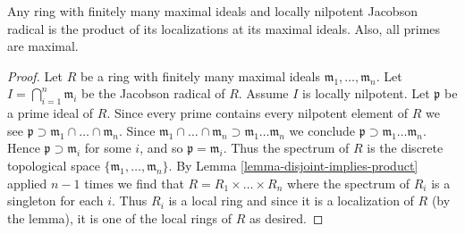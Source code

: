 \begin{lemma}
\label{lemma-product-local}
Any ring with finitely many maximal ideals and
locally nilpotent Jacobson radical is the product of its localizations
at its maximal ideals. Also, all primes are maximal.
\end{lemma}

\begin{proof}
Let $R$ be a ring with finitely many maximal ideals
$\mathfrak m_1, \ldots, \mathfrak m_n$.
Let $I = \bigcap_{i = 1}^n \mathfrak m_i$
be the Jacobson radical of $R$. Assume $I$ is locally nilpotent.
Let $\mathfrak p$ be a prime ideal of $R$.
Since every prime contains every nilpotent
element of $R$ we see
$ \mathfrak p \supset \mathfrak m_1 \cap \ldots \cap \mathfrak m_n$.
Since $\mathfrak m_1 \cap \ldots \cap \mathfrak m_n \supset
\mathfrak m_1 \ldots \mathfrak m_n$
we conclude $\mathfrak p \supset \mathfrak m_1 \ldots \mathfrak m_n$.
Hence $\mathfrak p \supset \mathfrak m_i$ for some $i$, and so
$\mathfrak p = \mathfrak m_i$. Thus the spectrum of $R$
is the discrete topological space $\{\mathfrak m_1, \ldots, \mathfrak m_n\}$.
By Lemma \ref{lemma-disjoint-implies-product} applied $n - 1$ times
we find that $R = R_1 \times \ldots \times R_n$ where the
spectrum of $R_i$ is a singleton for each $i$.
Thus $R_i$ is a local ring and since it is a localization of $R$
(by the lemma), it is one of the local rings of $R$ as desired.
\end{proof}